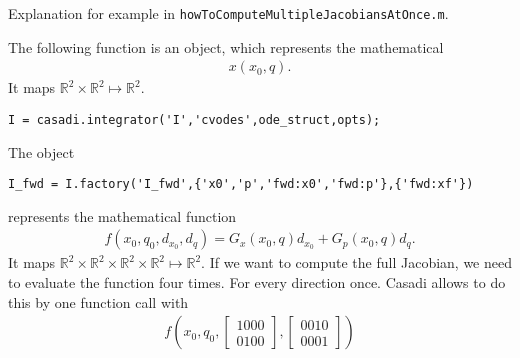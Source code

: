 Explanation for example in \texttt{howToComputeMultipleJacobiansAtOnce.m}.

The following function is an object, which represents the mathematical
\begin{align}
  x(x_0,q).
\end{align}
It maps $\mathbb{R}^2 \times \mathbb{R}^2 \mapsto \mathbb{R}^2$.
\begin{lstlisting}[basicstyle=\small]
  I = casadi.integrator('I','cvodes',ode_struct,opts);
\end{lstlisting}

The object 
\begin{lstlisting}[basicstyle=\small]
  I_fwd = I.factory('I_fwd',{'x0','p','fwd:x0','fwd:p'},{'fwd:xf'}) 
\end{lstlisting}
represents the mathematical function
\begin{align}
  f(x_0,q_0, d_{x_0},d_{q}) = G_x(x_0,q) d_{x_0} + G_p (x_0,q) d_q.
\end{align}
It maps $\mathbb{R}^2 \times \mathbb{R}^2 \times \mathbb{R}^2 \times \mathbb{R}^2\mapsto \mathbb{R}^2$.
If we want to compute the full Jacobian, we need to evaluate the function four times. For every direction once. Casadi allows to do this by one function call with
\begin{align}
  f(x_0,q_0, \begin{bmatrix} 1 0 0 0  \\ 0 1 0 0 \end{bmatrix},\begin{bmatrix}  0 0 1 0  \\  0 0 0 1 \end{bmatrix})
\end{align}

